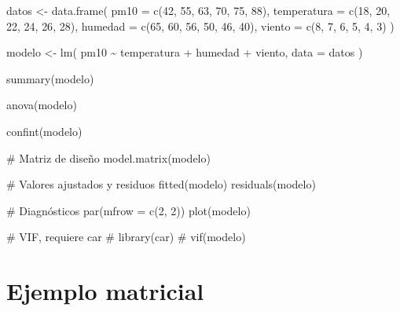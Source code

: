 \documentclass[
  spanish,
  11pt,
  letterpaper,
  DIV=11,
  numbers=noendperiod]{scrreprt}
\newenvironment{Shaded}{\begin{snugshade}}{\end{snugshade}}
\newcommand{\AttributeTok}[1]{\textcolor[rgb]{0.40,0.45,0.13}{#1}}
\newcommand{\CommentTok}[1]{\textcolor[rgb]{0.37,0.37,0.37}{#1}}
\newcommand{\DecValTok}[1]{\textcolor[rgb]{0.68,0.00,0.00}{#1}}
\newcommand{\FunctionTok}[1]{\textcolor[rgb]{0.28,0.35,0.67}{#1}}
\newcommand{\NormalTok}[1]{\textcolor[rgb]{0.00,0.23,0.31}{#1}}
\newcommand{\OtherTok}[1]{\textcolor[rgb]{0.00,0.23,0.31}{#1}}
\newcommand{\SpecialCharTok}[1]{\textcolor[rgb]{0.37,0.37,0.37}{#1}}
\theoremstyle{definition}
\theoremstyle{plain}
\theoremstyle{definition}
\theoremstyle{remark}
\begin{document}
\begin{Shaded}
\begin{Highlighting}[]
\NormalTok{datos }\OtherTok{\textless{}{-}} \FunctionTok{data.frame}\NormalTok{(}
  \AttributeTok{pm10 =} \FunctionTok{c}\NormalTok{(}\DecValTok{42}\NormalTok{, }\DecValTok{55}\NormalTok{, }\DecValTok{63}\NormalTok{, }\DecValTok{70}\NormalTok{, }\DecValTok{75}\NormalTok{, }\DecValTok{88}\NormalTok{),}
  \AttributeTok{temperatura =} \FunctionTok{c}\NormalTok{(}\DecValTok{18}\NormalTok{, }\DecValTok{20}\NormalTok{, }\DecValTok{22}\NormalTok{, }\DecValTok{24}\NormalTok{, }\DecValTok{26}\NormalTok{, }\DecValTok{28}\NormalTok{),}
  \AttributeTok{humedad =} \FunctionTok{c}\NormalTok{(}\DecValTok{65}\NormalTok{, }\DecValTok{60}\NormalTok{, }\DecValTok{56}\NormalTok{, }\DecValTok{50}\NormalTok{, }\DecValTok{46}\NormalTok{, }\DecValTok{40}\NormalTok{),}
  \AttributeTok{viento =} \FunctionTok{c}\NormalTok{(}\DecValTok{8}\NormalTok{, }\DecValTok{7}\NormalTok{, }\DecValTok{6}\NormalTok{, }\DecValTok{5}\NormalTok{, }\DecValTok{4}\NormalTok{, }\DecValTok{3}\NormalTok{)}
\NormalTok{)}

\NormalTok{modelo }\OtherTok{\textless{}{-}} \FunctionTok{lm}\NormalTok{(}
\NormalTok{  pm10 }\SpecialCharTok{\textasciitilde{}}\NormalTok{ temperatura }\SpecialCharTok{+}\NormalTok{ humedad }\SpecialCharTok{+}\NormalTok{ viento,}
  \AttributeTok{data =}\NormalTok{ datos}
\NormalTok{)}

\FunctionTok{summary}\NormalTok{(modelo)}

\FunctionTok{anova}\NormalTok{(modelo)}

\FunctionTok{confint}\NormalTok{(modelo)}

\CommentTok{\# Matriz de diseño}
\FunctionTok{model.matrix}\NormalTok{(modelo)}

\CommentTok{\# Valores ajustados y residuos}
\FunctionTok{fitted}\NormalTok{(modelo)}
\FunctionTok{residuals}\NormalTok{(modelo)}

\CommentTok{\# Diagnósticos}
\FunctionTok{par}\NormalTok{(}\AttributeTok{mfrow =} \FunctionTok{c}\NormalTok{(}\DecValTok{2}\NormalTok{, }\DecValTok{2}\NormalTok{))}
\FunctionTok{plot}\NormalTok{(modelo)}

\CommentTok{\# VIF, requiere car}
\CommentTok{\# library(car)}
\CommentTok{\# vif(modelo)}
\end{Highlighting}
\end{Shaded}

\section{Ejemplo matricial}\label{ejemplo-matricial}
\end{document}
